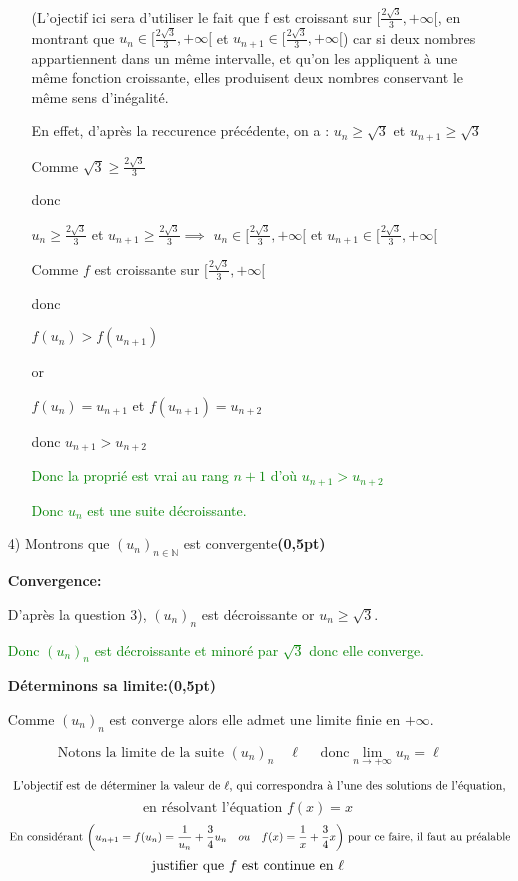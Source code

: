 \documentclass[12pt]{article}
\begin{document}
\begin{enumerate}
\begin{enumerate}
(L'ojectif ici sera d'utiliser le fait que f est croissant sur \( [\frac{2\sqrt{3}}{3}, +\infty[ \), en montrant que  \(u_{n}\in [\frac{2\sqrt{3}}{3}, +\infty[ \) et \(u_{n+1}\in [\frac{2\sqrt{3}}{3}, +\infty[ \)) car si deux nombres appartiennent dans un même intervalle, et qu'on les appliquent à une même fonction croissante, elles produisent deux nombres conservant le même sens d'inégalité.

En effet, d'après la reccurence précédente, on a : \(u_{n} \geq \sqrt{3}\) et \(u_{n+1} \geq \sqrt{3}\)

Comme \( \sqrt{3} \geq \frac{2\sqrt{3}}{3} \)

donc 

\(u_{n} \geq \frac{2\sqrt{3}}{3}\) et \(u_{n+1} \geq \frac{2\sqrt{3}}{3} \implies\) 
\(u_{n}\in [\frac{2\sqrt{3}}{3}, +\infty[ \) et \(u_{n+1}\in [\frac{2\sqrt{3}}{3}, +\infty[ \)

Comme \(f\) est croissante sur \( [\frac{2\sqrt{3}}{3}, +\infty[ \)

donc 

\( f(u_{n})>f(u_{n+1}) \) 

or 

\( f(u_{n})=u_{n+1} \) et \( f(u_{n+1})= u_{n+2}\)

donc \( u_{n+1} > u_{n+2} \)

\textcolor{green}{Donc la proprié est vrai au rang \(n+1\) d'où \( u_{n+1} > u_{n+2} \)}

\textcolor{green}{Donc \( u_{n} \) est une suite décroissante.}
\end{enumerate}
\item[4)] Montrons que $(u_n)_{n \in \mathbb{N}}$ est convergente\hfill\textbf{(0,5pt)}

\textbf{Convergence:}

D'après la question 3), \( (u_{n})_{n} \) est décroissante or \( u_{n} \geq \sqrt{3} \).

\textcolor{green}{Donc \( (u_{n})_{n} \) est décroissante et minoré par \( \sqrt{3} \) donc elle converge.}

\textbf{Déterminons sa limite:}\hfill\textbf{(0,5pt)}

Comme \( (u_{n})_{n} \) est converge alors elle admet une limite finie en \( +\infty \). 

\[ 
\text{ Notons la limite de la suite }  (u_{n})_{n} \quad \ell \quad \text{ donc}   \lim_{ n \to +\infty }u_{n}=\ell  
\]

\[ 
\text{ L'objectif est de déterminer la valeur de \( \ell \), qui correspondra à l'une des solutions de l'équation, }
\]
\[\text{en résolvant l'équation \(f(x) = x\)}\]
\[
\text{En considérant \( \left( u_{n+1}=f(u_{n})=\frac{1}{u_{n}}+\frac{3}{4}u_{n}\quad ou\quad f(x)=\frac{1}{x}+\frac{3}{4}x \right) \) 
 pour ce faire, il faut au préalable} 
\]
\[ 
\text{ justifier que \( f \) est continue en \( \ell \) }
\]


\end{enumerate}
\end{document}
